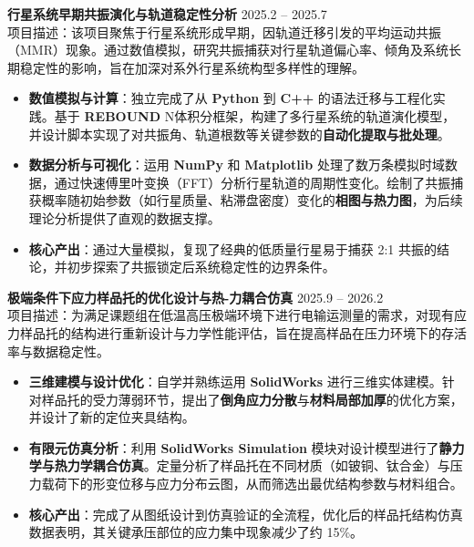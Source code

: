 \documentclass[11pt]{article}
\newlength{\interProjectSpacing}
\newcommand{\projectsep}{\vspace{\interProjectSpacing}}
\newlength{\intraProjectTitleSep}
\newcommand{\titlebreak}{\\[\intraProjectTitleSep]}
\newlength{\intraProjectListTopSep}
\begin{document}
\textbf{行星系统早期共振演化与轨道稳定性分析} \hfill 2025.2 -- 2025.7 \titlebreak
项目描述：该项目聚焦于行星系统形成早期，因轨道迁移引发的平均运动共振（MMR）现象。通过数值模拟，研究共振捕获对行星轨道偏心率、倾角及系统长期稳定性的影响，旨在加深对系外行星系统构型多样性的理解。
\begin{itemize}[nosep, topsep=\intraProjectListTopSep]
    \item \textbf{数值模拟与计算}：独立完成了从 \textbf{Python} 到 \textbf{C++} 的语法迁移与工程化实践。基于 \textbf{REBOUND} N体积分框架，构建了多行星系统的轨道演化模型，并设计脚本实现了对共振角、轨道根数等关键参数的\textbf{自动化提取与批处理}。
    \item \textbf{数据分析与可视化}：运用 \textbf{NumPy} 和 \textbf{Matplotlib} 处理了数万条模拟时域数据，通过快速傅里叶变换（FFT）分析行星轨道的周期性变化。绘制了共振捕获概率随初始参数（如行星质量、粘滞盘密度）变化的\textbf{相图与热力图}，为后续理论分析提供了直观的数据支撑。
    \item \textbf{核心产出}：通过大量模拟，复现了经典的低质量行星易于捕获 2:1 共振的结论，并初步探索了共振锁定后系统稳定性的边界条件。
\end{itemize}

\projectsep

\textbf{极端条件下应力样品托的优化设计与热-力耦合仿真} \hfill 2025.9 -- 2026.2 \titlebreak
项目描述：为满足课题组在低温高压极端环境下进行电输运测量的需求，对现有应力样品托的结构进行重新设计与力学性能评估，旨在提高样品在压力环境下的存活率与数据稳定性。
\begin{itemize}[nosep, topsep=\intraProjectListTopSep]
    \item \textbf{三维建模与设计优化}：自学并熟练运用 \textbf{SolidWorks} 进行三维实体建模。针对样品托的受力薄弱环节，提出了\textbf{倒角应力分散}与\textbf{材料局部加厚}的优化方案，并设计了新的定位夹具结构。
    \item \textbf{有限元仿真分析}：利用 \textbf{SolidWorks Simulation} 模块对设计模型进行了\textbf{静力学与热力学耦合仿真}。定量分析了样品托在不同材质（如铍铜、钛合金）与压力载荷下的形变位移与应力分布云图，从而筛选出最优结构参数与材料组合。
    \item \textbf{核心产出}：完成了从图纸设计到仿真验证的全流程，优化后的样品托结构仿真数据表明，其关键承压部位的应力集中现象减少了约 15\%。
\end{itemize}

\projectsep
\end{document}
